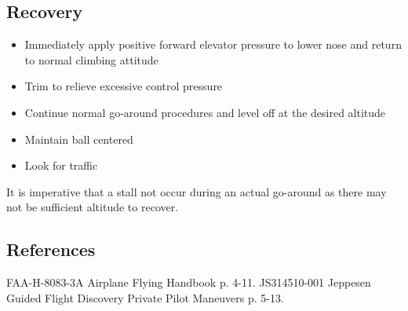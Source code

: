 \subsection{Recovery}

\begin{itemize}
  \item Immediately apply positive forward elevator pressure to lower nose and
    return to normal climbing attitude
  \item Trim to relieve excessive control pressure
  \item Continue normal go-around procedures and level off at the desired
    altitude 
  \item Maintain ball centered
  \item Look for traffic
\end{itemize}

It is imperative that a stall not occur during an actual go-around as there may
not be sufficient altitude to recover.

\subsection{References}
FAA-H-8083-3A Airplane Flying Handbook p. 4-11.
JS314510-001 Jeppesen Guided Flight Discovery Private Pilot Maneuvers p. 5-13.

